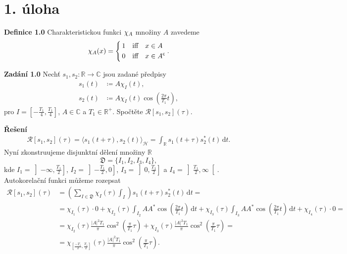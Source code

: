 \documentclass{article}
\begin{document}
\section*{1. úloha}

\noindent \textbf{Definice 1.0} Charakteristickou funkci $\mathnormal{\chi}_A$ množiny $A$ zavedeme
\[
    \chi_A(x) = 
    \begin{dcases}
        \,1 & \text{iff}\quad x \in A\\
        \,0 & \text{iff}\quad x \in A^{\mathsf{c}} \\
    \end{dcases}
    .
\]


\vspace{0.5em}
\noindent \textbf{Zadání 1.0} Nechť $s_1, s_2: \mathbb{R} \to \mathbb{C}$ jsou zadané předpisy
\begin{align*}
    s_1(t) &\coloneqq A \chi_{I}(t), \\
    s_2(t) &\coloneqq A \chi_{I}(t) \cos\left(\frac{2\pi}{T_1}t\right),
\end{align*}
pro $I = \left[-\frac{T_1}{4},\frac{T_1}{4}\right]$, $A \in \mathbb{C}$ a $T_1\in \mathbb{R^{+}}$. Spočtěte  $\mathcal{R}[s_1, s_2](\tau)$.
\vspace{0.5em}

\noindent \textbf{Řešení}
\begin{align*}
    \mathcal{R}[s_1, s_2](\tau) = \langle s_1(t + \tau), s_2(t)\rangle_{\mathcal{H}} = \int_{\mathbb{R}} s_1(t+\tau)s_2^{*}(t)\,\mathrm{d}t.
\end{align*}
Nyní zkonstruujeme disjunktní dělení množiny $\mathbb{R}$
\[
    \mathfrak{D} = \{I_1, I_2, I_3, I_4\},
\]
kde $I_1 = \left]-\infty, \frac{T_1}{2}\right]$, $I_2 = \left]-\frac{T_1}{2}, 0\right]$, $I_3 = \left]0, \frac{T_1}{2}\right]$ a $I_4 = \left]\frac{T_1}{2}, \infty\right[$. Autokorelační funkci můžeme rozepsat
\begin{align*}
    \mathcal{R}[s_1, s_2](\tau) &= \left(\sum_{I \in \mathfrak{D}} \chi_{I}(\tau) \int_{I}\right)s_1(t + \tau)s_2^{*}(t) \,\mathrm{d}t = \\ &= \chi_{I_1}(\tau) \cdot 0 + \chi_{I_2}(\tau) \int_{I_2} A A^{*} \cos\left(\frac{2 \pi}{T_1} t\right)\,\mathrm{d}t + \chi_{I_3}(\tau) \int_{I_3} A A^{*} \cos\left(\frac{2 \pi}{T_1} t\right)\,\mathrm{d}t + \chi_{I_4}(\tau) \cdot 0 = \\ &= \chi_{I_2}(\tau) \frac{|A|^2 T_1}{\pi} \cos ^2\left(\frac{\pi }{T_1}\tau\right) + \chi_{I_3}(\tau) \frac{|A|^2 T_1}{\pi} \cos ^2\left(\frac{\pi}{T_1} \tau \right) = \\ &= \chi_{\left[\frac{-T_1}{2}, \frac{T_1}{2}\right]}(\tau) \frac{|A|^2 T_1}{\pi} \cos^2\left(\frac{\pi}{T_1}\tau \right).
\end{align*}
\end{document}
